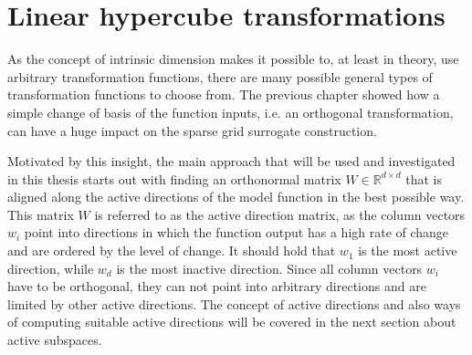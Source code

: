 \documentclass[
  a4paper,  %
  twoside,  %
  bibliography=totoc,
  headsepline,
  cleardoublepage=empty,
  parskip=half,
  draft=false
]{scrbook}
\begin{document}
\newpage
\begin{mdframed}[style=style]

\vspace{2.5mm}
\begin{figure}[H]

\centering
{}

\vspace{2.5mm}
\delimit
{}
\label{fig:dim_ranges}
\end{figure}
\end{mdframed}

\section{Linear hypercube transformations}

As the concept of intrinsic dimension makes it possible to, at least in theory, use arbitrary transformation functions, there are many possible general types of transformation functions to choose from.
The previous chapter showed how a simple change of basis of the function inputs, i.e. an orthogonal transformation, can have a huge impact on the sparse grid surrogate construction.

Motivated by this insight, the main approach that will be used and investigated in this thesis starts out with finding an orthonormal matrix $W \in \mathds{R}^{d \times d}$ that is aligned along the active directions of the model function in the best possible way.
This matrix $W$ is referred to as the active direction matrix, as the column vectors $w_i$ point into directions in which the function output has a high rate of change and are ordered by the level of change.
It should hold that $w_1$ is the most active direction, while $w_d$ is the most inactive direction.
Since all column vectors $w_i$ have to be orthogonal, they can not point into arbitrary directions and are limited by other active directions.
The concept of active directions and also ways of computing suitable active directions will be covered in the next section about active subspaces.
\end{document}
